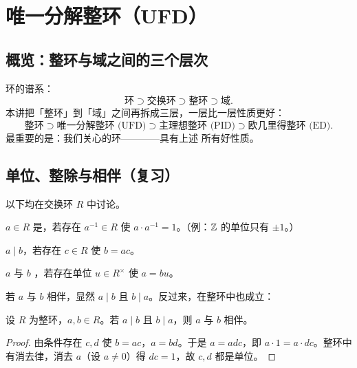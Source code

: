 \section{唯一分解整环（UFD）}\label{sec:ufd}

\subsection{概览：整环与域之间的三个层次}

环的谱系：
\[
  \text{环} \supset \text{交换环} \supset \text{整环} \supset \text{域}.
\]
本讲把「整环」到「域」之间再拆成三层，一层比一层性质更好：
\[
  \text{整环} \supset \text{唯一分解整环 (UFD)} \supset
  \text{主理想整环 (PID)} \supset \text{欧几里得整环 (ED)}.
\]
最重要的是：我们关心的环————具有上述
所有好性质。

\subsection{单位、整除与相伴（复习）}

以下均在交换环 $R$ 中讨论。

\begin{definition}[单位（Unit）]
$a\in R$ 是，若存在 $a^{-1}\in R$ 使
$a\cdot a^{-1} = 1$。（例：$\mathbb{Z}$ 的单位只有 $\pm 1$。）
\end{definition}

\begin{definition}[整除]
$a\mid b$，若存在 $c\in R$ 使 $b = ac$。
\end{definition}

\begin{definition}[相伴（Associate）]
$a$ 与 $b$ ，若存在单位 $u\in R^\times$ 使 $a = bu$。
\end{definition}

若 $a$ 与 $b$ 相伴，显然 $a\mid b$ 且 $b\mid a$。反过来，在整环中也成立：

\begin{proposition}[互整除则相伴]
设 $R$ 为整环，$a,b\in R$。若 $a\mid b$ 且 $b\mid a$，则 $a$ 与 $b$ 相伴。
\end{proposition}

\begin{proof}
由条件存在 $c,d$ 使 $b = ac$，$a = bd$。于是 $a = adc$，即
$a\cdot 1 = a\cdot dc$。整环中有消去律，消去 $a$（设 $a\ne 0$）得
$dc = 1$，故 $c, d$ 都是单位。
\end{proof}

